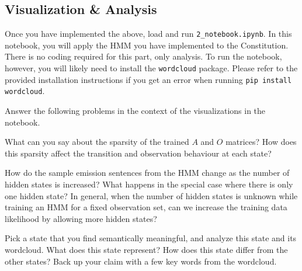 \subsection{Visualization \& Analysis}

Once you have implemented the above, load and run \texttt{2_notebook.ipynb}. In this notebook, you will apply the HMM you have implemented to the Constitution. There is no coding required for this part, only analysis. To run the notebook, however, you will likely need to install the \texttt{wordcloud} package. Please refer to the provided installation instructions if you get an error when running \texttt{pip install wordcloud}.

Answer the following problems in the context of the visualizations in the notebook.

\indent\problem[3] %
What can you say about the sparsity of the trained $A$ and $O$ matrices? How does this sparsity affect the transition and observation behaviour at each state?
\begin{solution}
\end{solution}

\indent\problem[5] %
How do the sample emission sentences from the HMM change as the number of hidden states is increased? What happens in the special case where there is only one hidden state? In general, when the number of hidden states is unknown while training an HMM for a fixed observation set, can we increase the training data likelihood by allowing more hidden states?

\begin{solution}
\end{solution}


\indent\problem[5] %
Pick a state that you find semantically meaningful, and analyze this state and its wordcloud. What does this state represent? How does this state differ from the other states? Back up your claim with a few key words from the wordcloud.
\begin{solution}
\end{solution}

